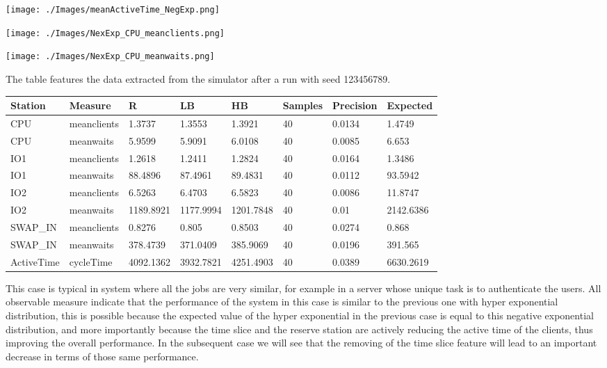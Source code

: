 \documentclass[12pt,a4paper]{article}
\begin{document}
\texttt{[image: ./Images/meanActiveTime\_NegExp.png]}

\texttt{[image: ./Images/NexExp\_CPU\_meanclients.png]}

\texttt{[image: ./Images/NexExp\_CPU\_meanwaits.png]}

The table features the data extracted from the simulator after a run with seed 123456789.


\begin{table}[!ht]
    \centering
    \begin{tabular}{|l|l|l|l|l|l|l|l|}
    \hline
    Station & Measure & R & LB & HB & Samples & Precision & Expected \\ \hline
    CPU & meanclients & 1.3737 & 1.3553 & 1.3921 & 40 & 0.0134 & 1.4749 \\ \hline
    CPU & meanwaits & 5.9599 & 5.9091 & 6.0108 & 40 & 0.0085 & 6.653 \\ \hline
    IO1 & meanclients & 1.2618 & 1.2411 & 1.2824 & 40 & 0.0164 & 1.3486 \\ \hline
    IO1 & meanwaits & 88.4896 & 87.4961 & 89.4831 & 40 & 0.0112 & 93.5942 \\ \hline
    IO2 & meanclients & 6.5263 & 6.4703 & 6.5823 & 40 & 0.0086 & 11.8747 \\ \hline
    IO2 & meanwaits & 1189.8921 & 1177.9994 & 1201.7848 & 40 & 0.01 & 2142.6386 \\ \hline
    SWAP\_IN & meanclients & 0.8276 & 0.805 & 0.8503 & 40 & 0.0274 & 0.868 \\ \hline
    SWAP\_IN & meanwaits & 378.4739 & 371.0409 & 385.9069 & 40 & 0.0196 & 391.565 \\ \hline
    ActiveTime & cycleTime & 4092.1362 & 3932.7821 & 4251.4903 & 40 & 0.0389 & 6630.2619 \\ \hline
    \end{tabular}
\end{table}

This case is typical in system where all the jobs are very similar, for example in a server whose unique task is to authenticate the users. All observable measure indicate that the performance of the system in this case is similar to the previous one with hyper exponential distribution, this is possible because the expected value of the hyper exponential in the previous case is equal to this negative exponential distribution, and more importantly because the time slice and the reserve station are actively reducing the active time of the clients, thus improving the overall performance. In the subsequent case we will see that the removing of the time slice feature will lead to an important decrease in terms of those same performance.
\end{document}
